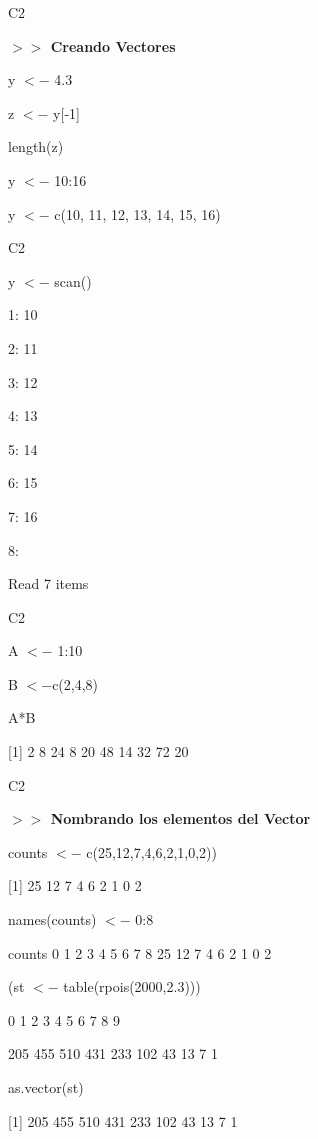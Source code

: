 \documentclass{beamer}
\theoremstyle{definition}
\theoremstyle{remark}
\begin{document}
\begin{frame}{C2}

\textbf{$>>$ Creando Vectores}

\hfill

y $<-$ 4.3

\hfill

z $<-$ y[-1]

\hfill

length(z)

\hfill

y $<-$ 10:16

\hfill

y $<-$ c(10, 11, 12, 13, 14, 15, 16)

\hfill

\end{frame}


\begin{frame}{C2}

y $<-$ scan()

1: 10

2: 11

3: 12

4: 13

5: 14

6: 15

7: 16

8:

Read 7 items

\hfill




\end{frame}


\begin{frame}{C2}

A $<-$ 1:10

\hfill

B $<- $c(2,4,8)

\hfill

A*B

\hfill

[1] 2 8 24 8 20 48 14 32 72 20

\end{frame}


\begin{frame}{C2}

\textbf{$>>$ Nombrando los elementos del Vector}


\hfill

counts $<-$ c(25,12,7,4,6,2,1,0,2))

[1] 25 12 7 4 6 2 1 0 2

\hfill

names(counts) $<-$ 0:8

\hfill

counts
0 1 2 3 4 5 6 7 8
25 12 7 4 6 2 1 0 2

\hfill

(st $<-$ table(rpois(2000,2.3)))

0 1 2 3 4 5 6 7 8 9

205 455 510 431 233 102 43 13 7 1

\hfill

as.vector(st)

[1] 205 455 510 431 233 102 43 13 7 1



\end{frame}
\end{document}

